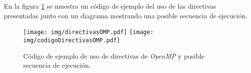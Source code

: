 En la figura \ref{directivas} se muestra un código de ejemplo del uso de las
directivas presentadas junto con un diagrama mostrando una posible secuencia
de ejecución.

\begin{figure}[h]

	\centering

	\texttt{[image: img/directivasOMP.pdf]}
	\texttt{[image: img/codigoDirectivasOMP.pdf]}

	\caption{Código de ejemplo de uso de directivas de \emph{OpenMP} y
	posible secuencia de ejecución.}

	\label{directivas}

\end{figure}
